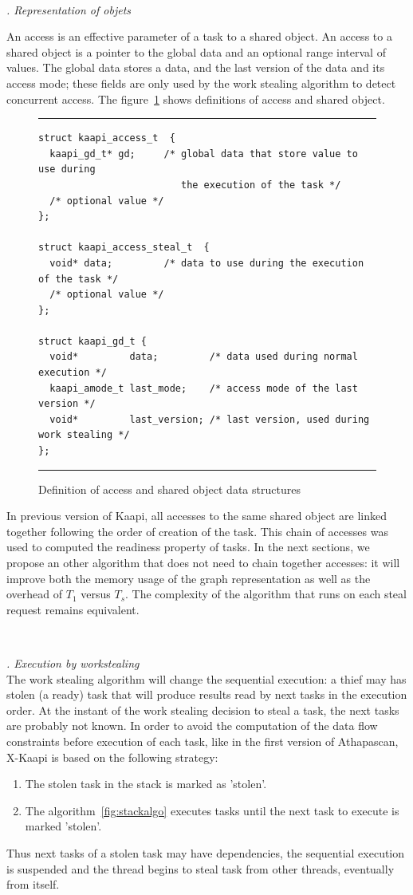 \documentclass[12pt]{report}
\newcommand{\kaapi}{\textsc{X}-Kaapi\xspace}
\renewcommand{\subsubsection}[1]{~\\ \addtocounter{subsubsection}{1} \noindent\textit{
\thesubsubsection. #1\\}}
\begin{document}
\subsubsection{Representation of objets}

An access is an effective parameter of a task to a shared object.
An access to a shared object is a pointer to the global data and an optional range interval of values.
The global data stores a data, and the last version of the data and its access mode; these fields 
are only used by the work stealing algorithm to detect concurrent access.
The figure~\ref{fig:repobject} shows definitions of access and shared object.
\begin{figure}[!h]
\hrule
\small
\begin{verbatim}
struct kaapi_access_t  {
  kaapi_gd_t* gd;     /* global data that store value to use during
                         the execution of the task */
  /* optional value */
};

struct kaapi_access_steal_t  {
  void* data;         /* data to use during the execution of the task */
  /* optional value */
};

struct kaapi_gd_t {
  void*         data;         /* data used during normal execution */
  kaapi_amode_t last_mode;    /* access mode of the last version */
  void*         last_version; /* last version, used during work stealing */
};
\end{verbatim}
\hrule
\caption{Definition of access and shared object data structures}
\label{fig:repobject}
\end{figure}
In previous version of Kaapi, all accesses to the same shared object are linked together following the order of creation of the task. This chain of accesses was used to computed the readiness property of tasks. In the next sections, we propose an other algorithm that does not need to chain together accesses: it will improve both the memory usage of the graph representation as well as the overhead of $T_1$ versus $T_s$. The complexity of the algorithm that runs on each steal request remains equivalent.

\subsubsection{Execution by workstealing}
The work stealing algorithm will change the sequential execution: a thief may has stolen (a ready) task that will produce results read by next tasks in the execution order. At the instant of the work stealing decision to steal a task, the next tasks are probably not known. In order to avoid the computation of the data flow constraints before execution of each task, like in the first version of Athapascan, \kaapi is based on the following strategy:
\begin{enumerate}
\item The stolen task in the stack is marked as 'stolen'.
\item The algorithm~\ref{fig:stackalgo} executes tasks until the next task to execute is marked 'stolen'.
\end{enumerate}
Thus next tasks of a stolen task may have dependencies, the sequential execution is suspended and the thread begins to steal task from other threads, eventually from itself. 
\end{document}
